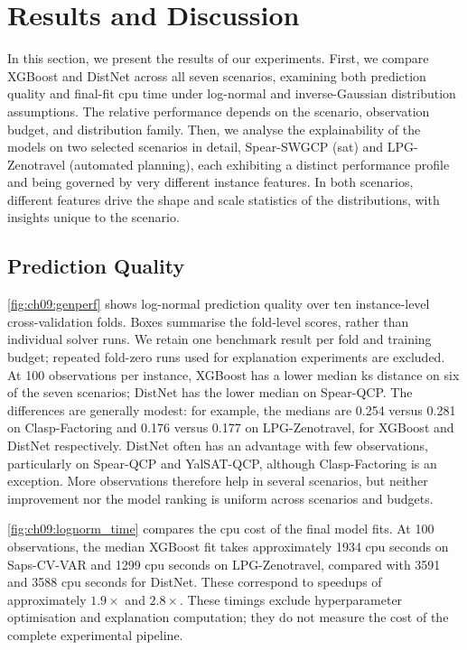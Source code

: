 \section{Results and Discussion}
\label{sec:ch09:results}
In this section, we present the results of our experiments.
First, we compare XGBoost and DistNet across all seven scenarios, examining both prediction quality and final-fit \gls{cpu} time under log-normal and inverse-Gaussian distribution assumptions. The relative performance depends on the scenario, observation budget, and distribution family.
Then, we analyse the explainability of the models on two selected scenarios in detail, Spear-SWGCP (\gls{sat}) and LPG-Zenotravel (automated planning), each exhibiting a distinct performance profile and being governed by very different instance features.
In both scenarios, different features drive the shape and scale statistics of the distributions, with insights unique to the scenario.

\subsection{Prediction Quality}

\cref{fig:ch09:genperf} shows log-normal prediction quality over ten instance-level cross-validation folds. Boxes summarise the fold-level scores, rather than individual solver runs. We retain one benchmark result per fold and training budget; repeated fold-zero runs used for explanation experiments are excluded. At 100 observations per instance, XGBoost has a lower median \gls{ks} distance on six of the seven scenarios; DistNet has the lower median on Spear-QCP. The differences are generally modest: for example, the medians are 0.254 versus 0.281 on Clasp-Factoring and 0.176 versus 0.177 on LPG-Zenotravel, for XGBoost and DistNet respectively. DistNet often has an advantage with few observations, particularly on Spear-QCP and YalSAT-QCP, although Clasp-Factoring is an exception. More observations therefore help in several scenarios, but neither improvement nor the model ranking is uniform across scenarios and budgets.

\cref{fig:ch09:lognorm_time} compares the \gls{cpu} cost of the final model fits. At 100 observations, the median XGBoost fit takes approximately 1934 \gls{cpu} seconds on Saps-CV-VAR and 1299 \gls{cpu} seconds on LPG-Zenotravel, compared with 3591 and 3588 \gls{cpu} seconds for DistNet. These correspond to speedups of approximately $1.9\times$ and $2.8\times$. These timings exclude hyperparameter optimisation and explanation computation; they do not measure the cost of the complete experimental pipeline.

